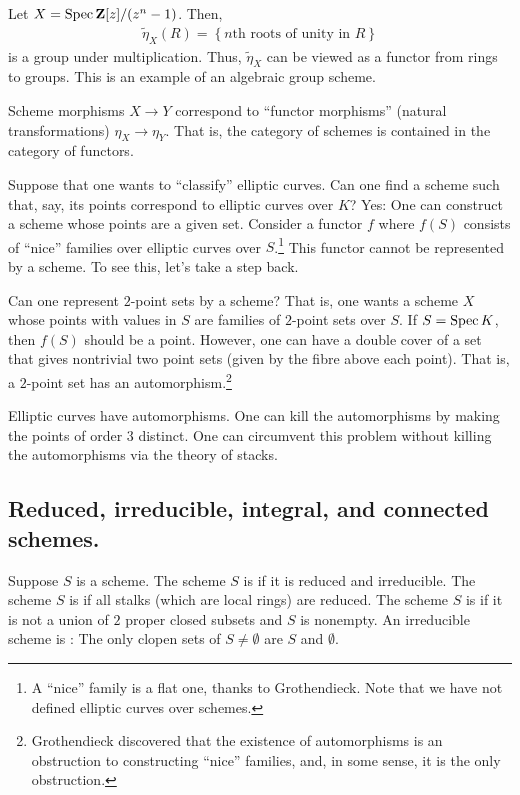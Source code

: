 \documentclass [11 pt, oneside] {article}
\begin{document}
\begin{example}[ ]\label{}\text{}
Let $X=\operatorname{Spec} \mathbf{Z}[z] / (z^n-1)$. Then, 
 \begin{align*}
	\tilde \eta_X(R) =  \left\{ \textrm{$n$th roots of unity in $R$}\right\} 
\end{align*}
is a group under multiplication. Thus, $\tilde\eta_X$ can be viewed as a functor from rings to groups. This is an example of an algebraic group scheme.
\end{example}

\begin{remark}
	Scheme morphisms $X\longrightarrow Y$ correspond to ``functor morphisms'' (natural transformations) $\eta_X\longrightarrow \eta_Y$. That is, the category of schemes is contained in the category of functors.
\end{remark}

Suppose that one wants to ``classify'' elliptic curves. Can one find a scheme such that, say, its points correspond to elliptic curves over $K$? Yes: One can construct a scheme whose points are a given set. Consider a functor $f$ where $f(S)$ consists of ``nice'' families over elliptic curves over $S$.\footnote{A ``nice'' family is a flat one, thanks to Grothendieck. Note that we have not defined elliptic curves over schemes.} This functor cannot be represented by a scheme. To see this, let's take a step back.

Can one represent $2$-point sets by a scheme? That is, one wants a scheme $X$ whose points with values in $S$ are families of $2$-point sets over $S$. If $S=\operatorname{Spec} K$, then $f(S)$ should be a point. However, one can have a double cover of a set that gives nontrivial two point sets (given by the fibre above each point). That is, a $2$-point set has an automorphism.\footnote{Grothendieck discovered that the existence of automorphisms is an obstruction to constructing ``nice'' families, and, in some sense, it is the only obstruction.} 

Elliptic curves have automorphisms. One can kill the automorphisms by making the points of order $3$ distinct. One can circumvent this problem without killing the automorphisms via the theory of stacks.

\subsection{Reduced, irreducible, integral, and connected schemes.}
Suppose $S$ is a scheme. The scheme $S$ is  if it is reduced and irreducible. The scheme $S$ is  if all stalks (which are local rings) are reduced. The scheme $S$ is  if it is not a union of $2$ proper closed subsets and $S$ is nonempty. An irreducible scheme is : The only clopen sets of $S\ne \emptyset$ are $S$ and $\emptyset$.
\end{document}
